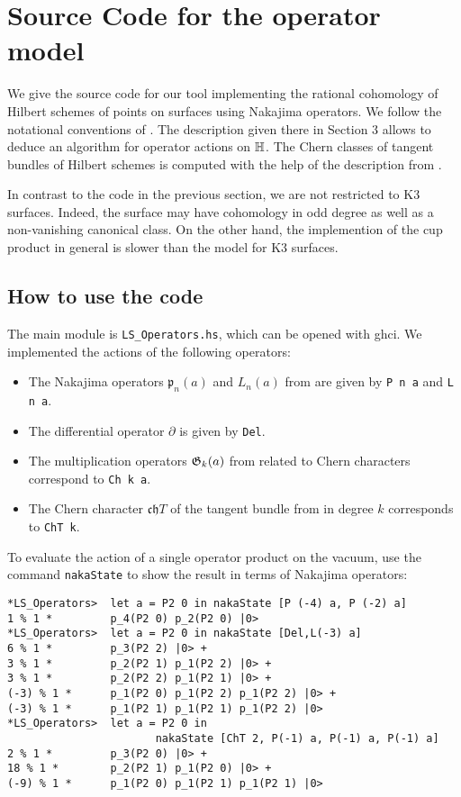 
\section{Source Code for the operator model}\label{VertexCode}
We give the source code for our tool implementing the rational cohomology of Hilbert schemes of points on surfaces using Nakajima operators. 
We follow the notational conventions of \cite{LehnSorger}. The description given there in Section 3 allows to deduce an algorithm for operator actions on $\mathbb{H}$. The Chern classes of  tangent bundles of Hilbert schemes is computed with the help of the description from \cite[Section 3]{Boissiere}.

In contrast to the code in the previous section, we are not restricted to K3 surfaces. Indeed, the surface may have cohomology in odd degree as well as a non-vanishing canonical class. On the other hand, the implemention of the cup product in general is slower than the model for K3 surfaces. 

\subsection{How to use the code}
The main module is \verb|LS_Operators.hs|, which can be opened with ghci.
We implemented the actions of the following operators:
\begin{itemize}
 \item The Nakajima operators $\mathfrak p_n(a)$ and $L_n(a)$ from \cite{LehnSorger} are given by \verb|P n a| and \verb|L n a|. 
 \item The differential operator $\partial$ is given by \verb|Del|.
 \item The multiplication operators $\mathfrak{G}_k(a)$ from \cite{LiQinWang} related to Chern characters correspond to \verb|Ch k a|.
 \item The Chern character $\mathfrak{ch}T$ of the tangent bundle from \cite{Boissiere} in degree $k$ corresponds to \verb|ChT k|.
\end{itemize}
\begin{example}
To evaluate the action of a single operator product on the vacuum, use the command \verb|nakaState| to show the result in terms of Nakajima operators:
\begin{verbatim}
*LS_Operators>  let a = P2 0 in nakaState [P (-4) a, P (-2) a]
1 % 1 *         p_4(P2 0) p_2(P2 0) |0>
*LS_Operators>  let a = P2 0 in nakaState [Del,L(-3) a]
6 % 1 *         p_3(P2 2) |0> +
3 % 1 *         p_2(P2 1) p_1(P2 2) |0> +
3 % 1 *         p_2(P2 2) p_1(P2 1) |0> +
(-3) % 1 *      p_1(P2 0) p_1(P2 2) p_1(P2 2) |0> +
(-3) % 1 *      p_1(P2 1) p_1(P2 1) p_1(P2 2) |0>
*LS_Operators>  let a = P2 0 in 
                       nakaState [ChT 2, P(-1) a, P(-1) a, P(-1) a]
2 % 1 *         p_3(P2 0) |0> +
18 % 1 *        p_2(P2 1) p_1(P2 0) |0> +
(-9) % 1 *      p_1(P2 0) p_1(P2 1) p_1(P2 1) |0>
\end{verbatim}
\end{example}

